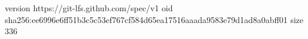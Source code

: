 version https://git-lfs.github.com/spec/v1
oid sha256:ee6996e6ff51b3c5c53ef767cf584d65ea17516aaada9583e79d1ad8a0abff01
size 336
